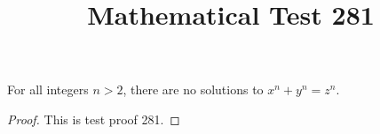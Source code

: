 \documentclass{amsart}
\begin{document}
\title{Mathematical Test 281}
\begin{theorem}
For all integers $n > 2$, there are no solutions to $x^n + y^n = z^n$.
\end{theorem}
\begin{proof}
This is test proof 281.
\end{proof}
\end{document}
